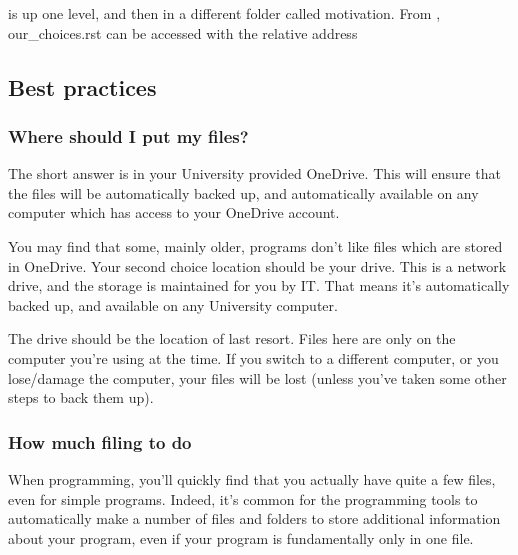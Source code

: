 \documentclass[letterpaper,10pt,british]{sphinxmanual}
\begin{document}
\sphinxAtStartPar
{} is up one level, and then in a different folder called motivation. From , our\_choices.rst can be accessed with the relative address

\begin{sphinxVerbatim}[commandchars=\\\{\}]
\end{sphinxVerbatim}


\subsection{Best practices}
\label{\detokenize{chapters/computer_software/files_and_folders:best-practices}}

\subsubsection{Where should I put my files?}
\label{\detokenize{chapters/computer_software/files_and_folders:where-should-i-put-my-files}}
\sphinxAtStartPar
The short answer is in your University provided OneDrive. This will ensure that the files will be automatically backed up, and automatically available on any computer which has access to your OneDrive account.

\sphinxAtStartPar
You may find that some, mainly older, programs don’t like files which are stored in OneDrive. Your second choice location should be your  drive. This is a network drive, and the storage is maintained for you by IT. That means it’s automatically backed up, and available on any University computer.

\sphinxAtStartPar
The  drive should be the location of last resort. Files here are only on the computer you’re using at the time. If you switch to a different computer, or you lose/damage the computer, your files will be lost (unless you’ve taken some other steps to back them up).


\subsubsection{How much filing to do}
\label{\detokenize{chapters/computer_software/files_and_folders:how-much-filing-to-do}}
\sphinxAtStartPar
When programming, you’ll quickly find that you actually have quite a few files, even for simple programs. Indeed, it’s common for the programming tools to automatically make a number of files and folders to store additional information about your program, even if your program is fundamentally only in one file.
\end{document}
